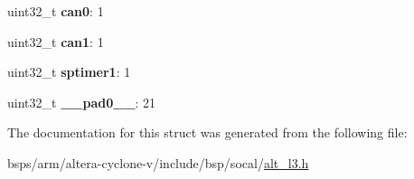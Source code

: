 \begin{DoxyCompactItemize}
uint32\+\_\+t {\bfseries can0}\+: 1
\item 
\mbox{\label{structALT__L3__SEC__L4SP__s_af440fa0299507c605b8ae70c10be1120}} 
uint32\+\_\+t {\bfseries can1}\+: 1
\item 
\mbox{\label{structALT__L3__SEC__L4SP__s_a4494a7d06c64a9f35c06f4bda835080d}} 
uint32\+\_\+t {\bfseries sptimer1}\+: 1
\item 
\mbox{\label{structALT__L3__SEC__L4SP__s_a1db504e67f6c825e0411392654c457da}} 
uint32\+\_\+t {\bfseries \+\_\+\+\_\+pad0\+\_\+\+\_\+}\+: 21
\end{DoxyCompactItemize}


The documentation for this struct was generated from the following file\+:\begin{DoxyCompactItemize}
\item 
bsps/arm/altera-\/cyclone-\/v/include/bsp/socal/\mbox{\hyperlink{alt__l3_8h}{alt\+\_\+l3.\+h}}\end{DoxyCompactItemize}

